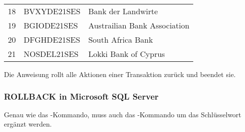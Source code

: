           \begin{center}
            \begin{small}
              \tablehead{}
              \begin{msoraclesql}
                \begin{supertabular}{rll}
                  18 & BVXYDE21SES & Bank der Landwirte \\
                  19 & BGIODE21SES & Austrailian Bank Association \\
                  20 & DFGHDE21SES & South Africa Bank \\
                  21 & NOSDEL21SES & Lokki Bank of Cyprus \\
                \end{supertabular}
              \end{msoraclesql}
            \end{small}
          \end{center}
          \begin{merke}
            Die Anweisung \ROLLBACK{} rollt alle Aktionen einer Transaktion
            zur\"uck und beendet sie.
          \end{merke}
        \subsubsection{ROLLBACK in Microsoft SQL Server}
          Genau wie das \COMMIT-Kommando, muss auch das \ROLLBACK-Kommando um
          das Schlüsselwort  ergänzt werden.
